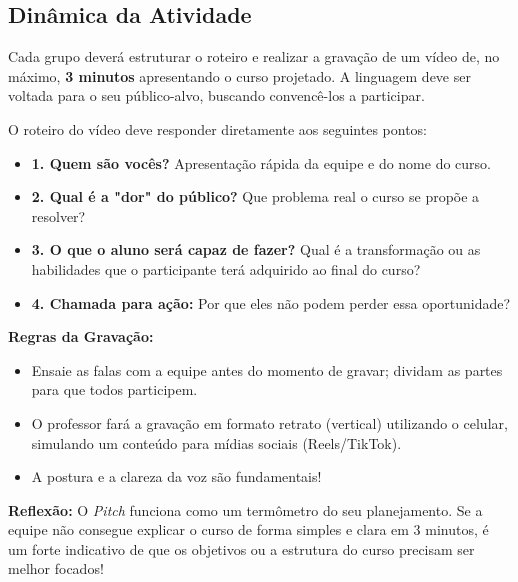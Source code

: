 \documentclass[12pt,a4paper]{article}
\begin{document}
\subsection*{Dinâmica da Atividade}

\begin{boxAtividade}

Cada grupo deverá estruturar o roteiro e realizar a gravação de um vídeo de, no máximo, \textbf{3 minutos} apresentando o curso projetado. A linguagem deve ser voltada para o seu público-alvo, buscando convencê-los a participar.

O roteiro do vídeo deve responder diretamente aos seguintes pontos:
\begin{itemize}
    \item \textbf{1. Quem são vocês?} Apresentação rápida da equipe e do nome do curso.
    \item \textbf{2. Qual é a "dor" do público?} Que problema real o curso se propõe a resolver?
    \item \textbf{3. O que o aluno será capaz de fazer?} Qual é a transformação ou as habilidades que o participante terá adquirido ao final do curso?
    \item \textbf{4. Chamada para ação:} Por que eles não podem perder essa oportunidade?
\end{itemize}

\vspace{0.3cm}
\textbf{Regras da Gravação:}
\begin{itemize}
    \item Ensaie as falas com a equipe antes do momento de gravar; dividam as partes para que todos participem.
    \item O professor fará a gravação em formato retrato (vertical) utilizando o celular, simulando um conteúdo para mídias sociais (Reels/TikTok).
    \item A postura e a clareza da voz são fundamentais!
\end{itemize}

\end{boxAtividade}

\begin{boxObservacao}
\textbf{Reflexão:} O \textit{Pitch} funciona como um termômetro do seu planejamento. Se a equipe não consegue explicar o curso de forma simples e clara em 3 minutos, é um forte indicativo de que os objetivos ou a estrutura do curso precisam ser melhor focados!
\end{boxObservacao}

\end{document}
